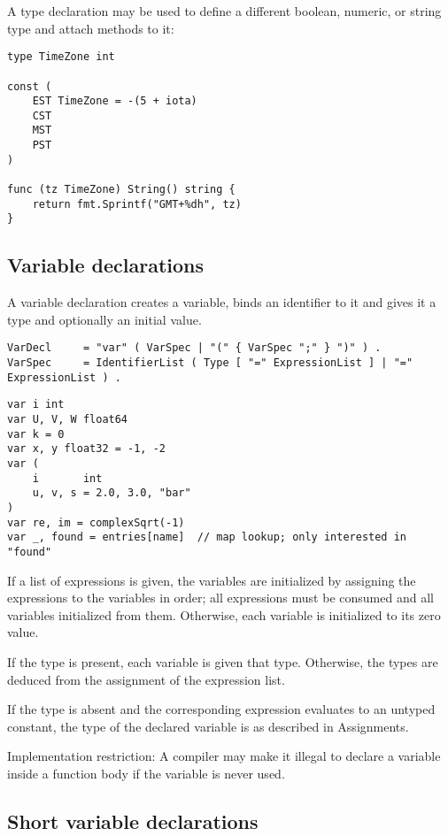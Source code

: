 A type declaration may be used to define a different boolean, numeric,
or string type and attach methods to it:

\begin{Verbatim}[frame=single]
type TimeZone int

const (
    EST TimeZone = -(5 + iota)
    CST
    MST
    PST
)

func (tz TimeZone) String() string {
    return fmt.Sprintf("GMT+%dh", tz)
}
\end{Verbatim}

\subsection*{Variable declarations}

A variable declaration creates a variable, binds an identifier to it and
gives it a type and optionally an initial value.

\begin{Verbatim}[frame=single]
VarDecl     = "var" ( VarSpec | "(" { VarSpec ";" } ")" ) .
VarSpec     = IdentifierList ( Type [ "=" ExpressionList ] | "=" ExpressionList ) .
\end{Verbatim}

\begin{Verbatim}[frame=single]
var i int
var U, V, W float64
var k = 0
var x, y float32 = -1, -2
var (
    i       int
    u, v, s = 2.0, 3.0, "bar"
)
var re, im = complexSqrt(-1)
var _, found = entries[name]  // map lookup; only interested in "found"
\end{Verbatim}

If a list of expressions is given, the variables are initialized
by assigning the expressions to the variables in order; all expressions
must be consumed and all variables initialized from them. Otherwise,
each variable is initialized to its zero value.

If the type is present, each variable is given that type. Otherwise, the
types are deduced from the assignment of the expression list.

If the type is absent and the corresponding expression evaluates to an
untyped constant, the type of the declared
variable is as described in Assignments.

Implementation restriction: A compiler may make it illegal to declare a
variable inside a function body if
the variable is never used.

\subsection*{Short variable declarations}

